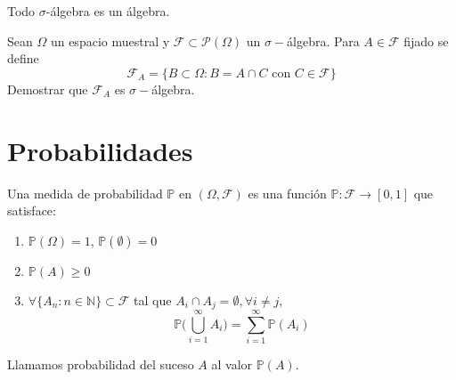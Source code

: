 \begin{obs}
Todo $\sigma$-álgebra es un álgebra.
\end{obs}

\begin{ejr}
Sean $\Omega$ un espacio muestral y $\mathcal{F}\subset\mathcal{P}(\Omega)$ un $\sigma-$álgebra. Para $A\in\mathcal{F}$ fijado se define \[ \mathcal{F}_A=\{ B\subset\Omega : B = A\cap C \text{ con } C\in\mathcal{F} \} \] Demostrar que $ \mathcal{F}_A $ es $\sigma-$álgebra.

\begin{sol}

\end{sol}
\end{ejr}

\begin{ejr}

\end{ejr}

\begin{ejr}

\end{ejr}

\begin{ejr}

\end{ejr}

\section{Probabilidades}

\begin{defn}
Una medida de probabilidad $\mathbb{P}$ en $(\Omega,\mathcal{F})$ es una función $\mathbb{P}: \mathcal{F}\rightarrow [0,1]$ que satisface:

\begin{enumerate}[label=(\roman*)]
    \item $\mathbb{P}(\Omega) = 1$, $\mathbb{P}(\emptyset) = 0$
    \item $\mathbb{P}(A) \geq 0$
    \item $\forall \{A_n: n\in\mathbb{N}\}\subset\mathcal{F}$ tal que $A_i \cap A_j = \emptyset, \forall i\neq j,$ \[ \mathbb{P}\bigg(\bigcup_{i=1}^\infty A_i \bigg) = \sum_{i=1}^\infty \mathbb{P}(A_i) \]
\end{enumerate}
Llamamos probabilidad del suceso $A$ al valor $\mathbb{P}(A)$.
\end{defn}

